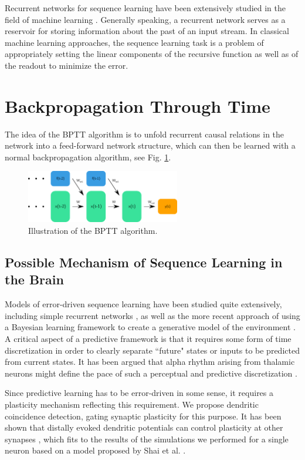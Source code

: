 \documentclass[10pt,a4paper]{article}
\begin{document}
Recurrent networks for sequence learning have been extensively studied in the field of machine learning \cite{Rumelhart_1988,Elman_1990}. Generally speaking, a recurrent network serves as a reservoir for storing information about the past of an input stream. In classical machine learning approaches, the sequence learning task is a problem of appropriately setting the linear components of the recursive function as well as of the readout to minimize the error.

\section{Backpropagation Through Time}
The idea of the BPTT algorithm is to unfold recurrent causal relations in the network into a feed-forward network structure, which can then be learned with a normal backpropagation algorithm, see Fig. \ref{fig:BPTT}.
\begin{figure}
\centering
\includegraphics[width=0.6\textwidth]{./figures/backpropagation_through_time.png}
\caption{Illustration of the BPTT algorithm.}
\label{fig:BPTT}
\end{figure}

\subsection{Possible Mechanism of Sequence Learning in the Brain}

Models of error-driven sequence learning have been studied quite extensively, including simple recurrent networks \cite{Elman_1990,Jordan_1989}, as well as the more recent approach of using a Bayesian learning framework to create a generative model of the environment \cite{Friston_2005}. A critical aspect of a predictive framework is that it requires some form of time discretization in order to clearly separate ``future" states or inputs to be predicted from current states. It has been argued that alpha rhythm arising from thalamic neurons might define the pace of such a perceptual and predictive discretization \cite{OReilly_2014}.

Since predictive learning has to be error-driven in some sense, it requires a plasticity mechanism reflecting this requirement. We propose dendritic coincidence detection, gating synaptic plasticity for this purpose. It has been shown that distally evoked dendritic potentials can control plasticity at other synapses \cite{Clopath_Bono_2017}, which fits to the results of the simulations we performed for a single neuron based on a model proposed by Shai et al. \cite{Shai_2015}.
\end{document}

